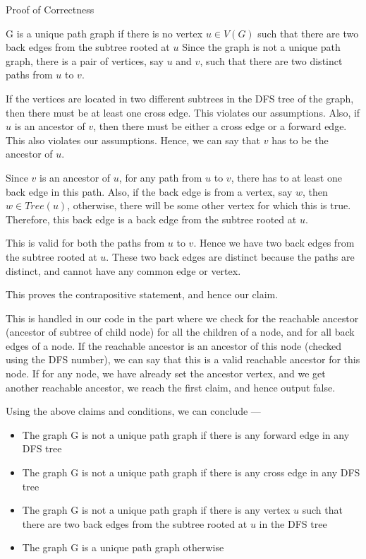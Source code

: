 \documentclass{article}
\begin{document}
\begin{question}
\begin{qsection}{Proof of Correctness}
\begin{qproof}{G is a unique path graph if there is no vertex $u \in V(G)$ such that there are two back edges from the subtree rooted at $u$}
			Since the graph is not a unique path graph, there is a pair of vertices, say $u$ and $v$, such that there are two distinct paths from $u$ to $v$. \br\

			If the vertices are located in two different subtrees in the DFS tree of the graph, then there must be at least one cross edge. This violates our assumptions. Also, if $u$ is an ancestor of $v$, then there must be either a cross edge or a forward edge. This also violates our assumptions. Hence, we can say that $v$ has to be the ancestor of $u$. \br\

			Since $v$ is an ancestor of $u$, for any path from $u$ to $v$, there has to at least one back edge in this path. Also, if the back edge is from a vertex, say $w$, then $w \in Tree(u)$, otherwise, there will be some other vertex for which this is true. Therefore, this back edge is a back edge from the subtree rooted at $u$. \br\

			This is valid for both the paths from $u$ to $v$. Hence we have two back edges from the subtree rooted at $u$. These two back edges are distinct because the paths are distinct, and cannot have any common edge or vertex. \br\

			This proves the contrapositive statement, and hence our claim.
			
		\end{qproof}

		This is handled in our code in the part where we check for the reachable ancestor (ancestor of subtree of child node) for all the children of a node, and for all back edges of a node. If the reachable ancestor is an ancestor of this node (checked using the DFS number), we can say that this is a valid reachable ancestor for this node. If for any node, we have already set the ancestor vertex, and we get another reachable ancestor, we reach the first claim, and hence output false. \br\

		Using the above claims and conditions, we can conclude ---

		\begin{itemize}
			\item The graph G is not a unique path graph if there is any forward edge in any DFS tree
			\item The graph G is not a unique path graph if there is any cross edge in any DFS tree
			\item The graph G is not a unique path graph if there is any vertex $u$ such that there are two back edges from the subtree rooted at $u$ in the DFS tree
			\item The graph G is a unique path graph otherwise
		\end{itemize}


\end{qsection}
\end{question}
\end{document}
